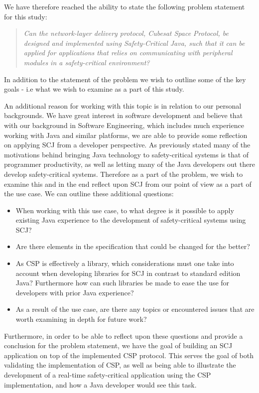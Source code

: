 We have therefore reached the ability to state the following problem statement for this study:
\begin{quotation}
	\textit{Can the network-layer delivery protocol, Cubesat Space Protocol, be designed and implemented using Safety-Critical Java, such that it can be applied for applications that relies on communicating with peripheral modules in a safety-critical environment?}
\end{quotation}
In addition to the statement of the problem we wish to outline some of the key goals - i.e what we wish to examine as a part of this study.

An additional reason for working with this topic is in relation to our personal backgrounds. We have great interest in software development and believe that with our background in Software Engineering, which includes much experience working with Java and similar platforms, we are able to provide some reflection on applying SCJ from a developer perspective. As previously stated many of the motivations behind bringing Java technology to safety-critical systems is that of programmer productivity, as well as letting many of the Java developers out there develop safety-critical systems. Therefore as a part of the problem, we wish to examine this and in the end reflect upon SCJ from our point of view as a part of the use case. We can outline these additional questions:
\begin{itemize}
	\item When working with this use case, to what degree is it possible to apply existing Java experience to the development of safety-critical systems using SCJ?
	\item Are there elements in the specification that could be changed for the better?
	\item As CSP is effectively a library, which considerations must one take into account when developing libraries for SCJ in contrast to standard edition Java? Furthermore how can such libraries be made to ease the use for developers with prior Java experience?
	\item As a result of the use case, are there any topics or encountered issues that are worth examining in depth for future work?
\end{itemize}

Furthermore, in order to be able to reflect upon these questions and provide a conclusion for the problem statement, we have the goal of building an SCJ application on top of the implemented CSP protocol. This serves the goal of both validating the implementation of CSP, as well as being able to illustrate the development of a real-time safety-critical application using the CSP implementation, and how a Java developer would see this task.




